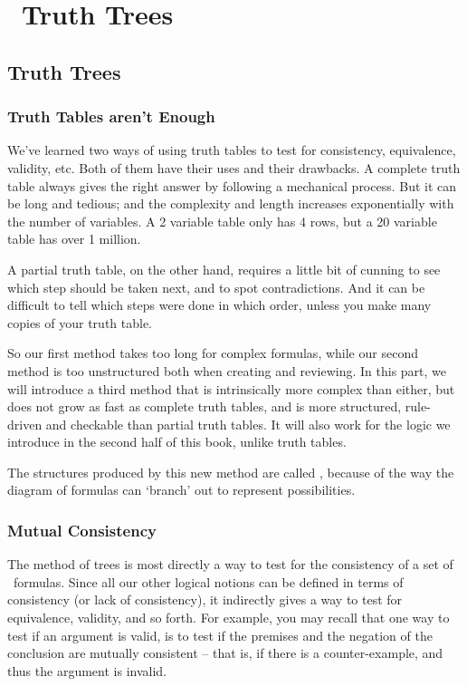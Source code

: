 \documentclass[PHIL101-Textbook.tex]{subfiles}
\begin{document}
\part{\tfl\ Truth Trees}\label{part:tfl.trees}

\chapter{Truth Trees}\label{ch:chaptertruthtrees}

\section{Truth Tables aren't Enough}

We've learned two ways of using truth tables to test for consistency, equivalence, validity, etc. Both of them have their uses and their drawbacks. A complete truth table always gives the right answer by following a mechanical process. But it can be long and tedious; and the complexity and length increases exponentially with the number of variables. A 2 variable table only has 4 rows, but a 20 variable table has over 1 million.

A partial truth table, on the other hand, requires a little bit of cunning to see which step should be taken next, and to spot contradictions. And it can be difficult to tell which steps were done in which order, unless you make many copies of your truth table.

So our first method takes too long for complex formulas, while our second method is too unstructured both when creating and reviewing. In this part, we will introduce a third method that is intrinsically more complex than either, but does not grow as fast as complete truth tables, and is more structured, rule-driven and checkable than partial truth tables. It will also work for the logic we introduce in the second half of this book, unlike truth tables.

The structures produced by this new method are called , because of the way the diagram of formulas can `branch' out to represent possibilities. 



\section{Mutual Consistency}

The method of trees is most directly a way to test for the consistency of a set of \tfl\ formulas. Since all our other logical notions can be defined in terms of consistency (or lack of consistency), it indirectly gives a way to test for equivalence, validity, and so forth. For example, you may recall that one way to test if an argument is valid, is to  test if the premises and the negation of the conclusion are mutually consistent -- that is, if there is a counter-example, and thus the argument is invalid.
\end{document}
